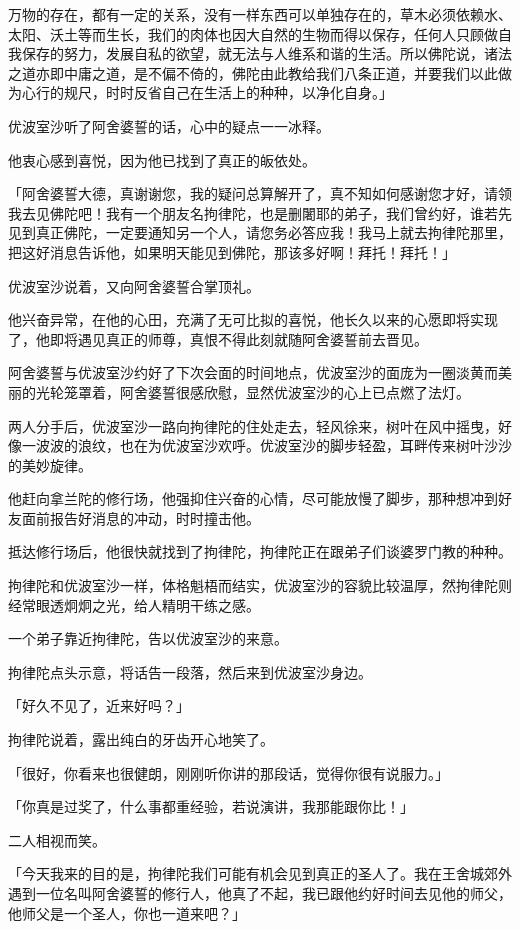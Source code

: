 \documentclass[12pt,twoside,openany]{book}
\begin{document}
万物的存在，都有一定的关系，没有一样东西可以单独存在的，草木必须依赖水、太阳、沃土等而生长，我们的肉体也因大自然的生物而得以保存，任何人只顾做自我保存的努力，发展自私的欲望，就无法与人维系和谐的生活。所以佛陀说，诸法之道亦即中庸之道，是不偏不倚的，佛陀由此教给我们八条正道，并要我们以此做为心行的规尺，时时反省自己在生活上的种种，以净化自身。」

优波室沙听了阿舍婆誓的话，心中的疑点一一冰释。

他衷心感到喜悦，因为他已找到了真正的皈依处。

「阿舍婆誓大德，真谢谢您，我的疑问总算解开了，真不知如何感谢您才好，请领我去见佛陀吧！我有一个朋友名拘律陀，也是删闍耶的弟子，我们曾约好，谁若先见到真正佛陀，一定要通知另一个人，请您务必答应我！我马上就去拘律陀那里，把这好消息告诉他，如果明天能见到佛陀，那该多好啊！拜托！拜托！」

优波室沙说着，又向阿舍婆誓合掌顶礼。

他兴奋异常，在他的心田，充满了无可比拟的喜悦，他长久以来的心愿即将实现了，他即将遇见真正的师尊，真恨不得此刻就随阿舍婆誓前去晋见。

阿舍婆誓与优波室沙约好了下次会面的时间地点，优波室沙的面庞为一圈淡黄而美丽的光轮笼罩着，阿舍婆誓很感欣慰，显然优波室沙的心上已点燃了法灯。

两人分手后，优波室沙一路向拘律陀的住处走去，轻风徐来，树叶在风中摇曳，好像一波波的浪纹，也在为优波室沙欢呼。优波室沙的脚步轻盈，耳畔传来树叶沙沙的美妙旋律。

他赶向拿兰陀的修行场，他强抑住兴奋的心情，尽可能放慢了脚步，那种想冲到好友面前报告好消息的冲动，时时撞击他。

抵达修行场后，他很快就找到了拘律陀，拘律陀正在跟弟子们谈婆罗门教的种种。

拘律陀和优波室沙一样，体格魁梧而结实，优波室沙的容貌比较温厚，然拘律陀则经常眼透炯炯之光，给人精明干练之感。

一个弟子靠近拘律陀，告以优波室沙的来意。

拘律陀点头示意，将话告一段落，然后来到优波室沙身边。

「好久不见了，近来好吗？」

拘律陀说着，露出纯白的牙齿开心地笑了。

「很好，你看来也很健朗，刚刚听你讲的那段话，觉得你很有说服力。」

「你真是过奖了，什么事都重经验，若说演讲，我那能跟你比！」

二人相视而笑。

「今天我来的目的是，拘律陀我们可能有机会见到真正的圣人了。我在王舍城郊外遇到一位名叫阿舍婆誓的修行人，他真了不起，我已跟他约好时间去见他的师父，他师父是一个圣人，你也一道来吧？」
\end{document}
